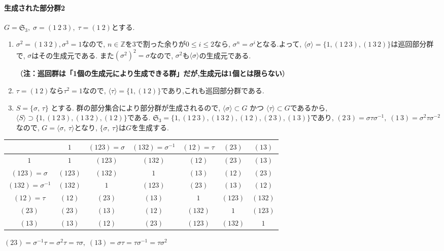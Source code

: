 \paragraph*{生成された部分群2}
$G=\mathfrak{S}_3, \; \sigma=(1\: 2\: 3),\; \tau=(1\: 2)$とする.
\begin{enumerate}
	\item $\sigma^2=(1\: 3\: 2), \sigma^3=1$なので,
	$n\in\mathbb{Z}$を$3$で割った余りが$0\leq i\leq 2$なら,
	$\sigma^n=\sigma^i$となる.よって,
	$\langle \sigma \rangle=\{ 1, (1\, 2\, 3), (1\, 3\, 2)\}$は巡回部分群で,
	$\sigma$はその生成元である. また$(\sigma^2)^2=\sigma$なので,
	$\sigma^2$も$\langle \sigma \rangle$の生成元である.

	（\textbf{注：巡回群は「1個の生成元により生成できる群」だが,生成元は1個とは限らない}）
	\item $\tau=(1\, 2)$なら$\tau^2=1$なので,
	$\langle \tau \rangle=\{1,(1\,2)\}$であり,これも巡回部分群である.
	\item $ S=\{\sigma,\, \tau \}$ とする.
	群の部分集合により部分群が生成されるので,
	$\langle \sigma \rangle \subset G $ かつ 
	$\langle \tau \rangle \subset G $であるから,
	$ \langle S \rangle \supset \{1, (1\, 2\, 3), (1\, 3\, 2), (1\, 2)\}$である.
	$ \mathfrak{S}_3 = \{1, (1\, 2\, 3), (1\, 3\, 2), (1\, 2), (2\, 3), (1\, 3) \}$であり,
	$(2 \,3)=\sigma \tau \sigma^{-1},\; (1\, 3)=\sigma^2 \tau \sigma^{-2} $なので,
	$ G=\langle \sigma,\: \tau \rangle $となり, 
    $\{\sigma,\: \tau\}$は$G$を生成する.
\end{enumerate}


\begin{tabular}{c|cccccc}
	 & $1$ & $(123)=\sigma$ & $(132)=\sigma^{-1}$ & $(12)=\tau$ & $(23)$ & $(13)$\\ \hline
	$1$ & $1$ & $(123)$ & $(132)$ & $(12)$ & $(23)$ & $(13)$ \\
	$(123)=\sigma$ & $(123)$ & $(132)$ & $1$ & $(13)$ & $(12)$ & $(23)$ \\
	$(132)=\sigma^{-1}$ & $(132)$ & $1$ & $(123)$ & $(23)$ & $(13)$ & $(12)$ \\ 
	$(12)=\tau$ & $(12)$ & $(23)$ & $(13)$ & $1$ & $(123)$ & $(132)$ \\
	$(23)$ & $(23)$ & $(13)$ & $(12)$ & $(132)$ & $1$ & $(123)$ \\
	$(13)$  & $(13)$ & $(12)$ & $(23)$ & $(123)$ & $(132)$ & $1$ \\ \hline
\end{tabular}

$ (23)=\sigma^{-1}\tau=\sigma^2\tau=\tau\sigma,\; 
(13)=\sigma\tau=\tau\sigma^{-1}=\tau\sigma^2$\\

